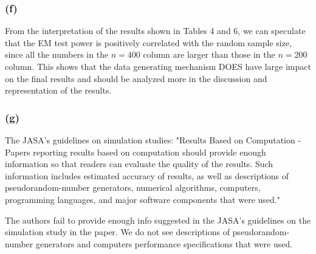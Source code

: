 \documentclass{article}
\begin{document}
\subsubsection*{(f)}

\hspace{12 pt} From the interpretation of the results shown in Tables 4 and 6, we can speculate that the EM test power is positively 
correlated with the random sample size, since all the numbers in the $n=400$ column are larger than those in the $n=200$
column. This shows that the data generating mechanism DOES have large impact on the final results and should be 
analyzed more in the discussion and representation of the results.


\subsubsection*{(g)}

\hspace{12 pt} The JASA's guidelines on simulation studies:
"Results Based on Computation - Papers reporting results based on computation should provide
enough information so that readers can evaluate the quality of the results. Such information
includes estimated accuracy of results, as well as descriptions of pseudorandom-number generators,
numerical algorithms, computers, programming languages, and major software components
that were used."

The authors fail to provide enough info suggested in the JASA's guidelines on the simulation study in the paper. 
We do not see descriptions of pseudorandom-number generators and computers performance specifications that were used.
\end{document}
